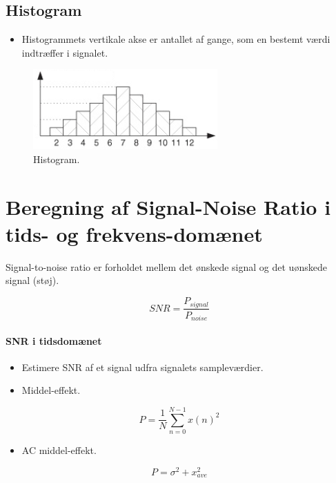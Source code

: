\documentclass[danish]{article}
\begin{document}
\subsection{Histogram}
\begin{itemize}
	\item Histogrammets vertikale akse er antallet af gange, som en bestemt værdi indtræffer i signalet.
\end{itemize}

\begin{figure} [H]
	\centering
	\includegraphics[width=0.4\linewidth]{graphics/histogram}
	\caption{Histogram.}
	\label{fig:histogram}
\end{figure}

\newpage
\section{Beregning af Signal-Noise Ratio i tids- og frekvens-domænet}

Signal-to-noise ratio er forholdet mellem det ønskede signal og det uønskede signal (støj).

\begin{equation}
SNR = \frac{P_{signal}}{P_{noise}}
\end{equation}

\paragraph{SNR i tidsdomænet}
\begin{itemize}
	\item Estimere SNR af et signal udfra signalets sampleværdier. 
	\item Middel-effekt.
\end{itemize}

\begin{equation}
P = \frac{1}{N} \sum_{n=0}^{N-1}x(n)^2
\end{equation}

\begin{itemize}
	\item AC middel-effekt.
\end{itemize}

\begin{equation}
P = {\sigma}^2 + x_{ave}^2
\end{equation}
\end{document}
